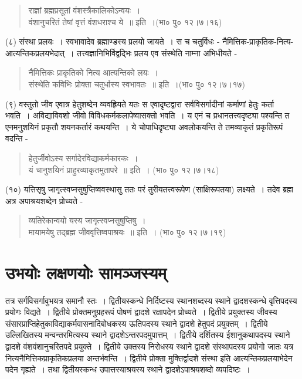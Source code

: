 {\begin{verse}
राज्ञां ब्रह्मप्रसूतां वंशस्त्रैकालिकोऽन्वयः~।\\
वंशानुचरितं तेषां वृत्तं वंशधराश्च ये~॥ इति~।(भा० पु० १२।७।१६)
\end{verse}
(८) संस्था प्रलयः~। स्वभावादेव ब्रह्माण्डस्य प्रलयो जायते~। स च चतुर्विधः - नैमित्तिक-प्राकृतिक-नित्य-आत्यन्तिकप्रलयभेदात्~। तत्त्वज्ञानिभिर्विद्वद्भिः प्रलय एव संस्थेति नाम्ना अभिधीयते -
\begin{verse}
नैमित्तिकः प्राकृतिको नित्य आत्यन्तिको लयः~।\\
संस्थेति कविभिः प्रोक्ता चतुर्धास्य स्वभावतः~॥ इति~।(भा० पु० १२।७।१७)
\end{verse}
(९) वस्तुतो जीव एवात्र हेतुशब्देन व्यवह्रियते यतः स एवादृष्टद्वारा सर्वविसर्गादीनां कर्माणां हेतुः कर्ता भवति~। अविद्याविवशो जीवो विविधकर्मकलापेष्वासक्तो भवति~। य एनं च प्रधानतत्त्वदृष्ट्या पश्यन्ति त एनमनुशयिनं प्रकृतौ शयनकर्तारं कथयन्ति~। ये चोपाधिदृष्ट्या अवलोकयन्ति ते तमव्याकृतं प्रकृतिरूपं वदन्ति -
\begin{verse}
हेतुर्जीवोऽस्य सर्गादेरविद्याकर्मकारकः~।\\
यं चानुशयिनं प्राहुरव्याकृतमुतापरे~॥ इति~। (भा० पु० १२।७।१८)
\end{verse}
(१०) यत्तिसृषु जागृत्स्वप्नसुषुप्तिष्ववस्थासु ततः परं तुरीयतत्त्वरूपेण (साक्षिरूपतया) लक्ष्यते~। तदेव ब्रह्म अत्र अपाश्रयशब्देन प्रोच्यते -
\begin{verse}
व्यतिरेकान्वयो यस्य जागृत्स्वप्नसुषुप्तिषु~।\\
मायामयेषु तद्ब्रह्म जीववृत्तिष्वपाश्रयः~॥ इति~। (भा० पु० १२।७।१९)
\end{verse}

\section*{उभयोः लक्षणयोः सामञ्जस्यम्}

तत्र सर्गविसर्गावुभयत्र समानौ स्तः~। द्वितीयस्कन्धे निर्दिष्टस्य स्थानशब्दस्य स्थाने द्वादशस्कन्धे वृत्तिपदस्य प्रयोगः विद्यते~। द्वितीये प्रोक्तमनुग्रहरूपं पोषणं द्वादशे रक्षापदेन प्रोच्यते~। द्वितीये प्रयुक्तस्य जीवस्य संसारप्राप्तिहेतुकाविद्याकर्मवासनादिबोधकस्य ऊतिपदस्य स्थाने द्वादशे हेतुपदं प्रयुक्तम्~। द्वितीये उल्लिखितस्य मन्वन्तरमित्यस्य स्थाने द्वादशेऽन्तरपदमुपात्तम्~। द्वितीये दर्शितस्य ईशानुकथापदस्य स्थाने द्वादशे वंशवंशानुचरितपदे प्रयुक्ते~। द्वितीये उक्तस्य निरोधस्य स्थाने द्वादशे संस्थापदस्य प्रयोगो जातः यत्र नित्यनैमित्तिकप्राकृतिकप्रलया अन्तर्भवन्ति~। द्वितीये प्रोक्ता मुक्तिर्द्वादशे संस्था इति आत्यन्तिकप्रलयाभेदेन पदेन गृह्यते~। तथा द्वितीयस्कन्ध उपात्तस्याश्रयस्य स्थाने द्वादशेऽपाश्रयशब्दो व्यपदिष्टः~।

}

